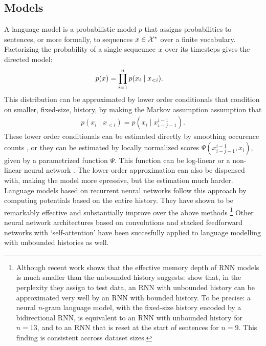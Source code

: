   \subsection{Models}
    A language model is a probabilistic model $p$ that assigns probabilities to sentences, or more formally, to sequences $x \in \mathcal{X}^{*}$ over a finite vocabulary. Factorizing the probability of a single sequeunce $x$ over its timesteps gives the directed model:
    \begin{align}
      \label{eq:lm-factorized}
      p( x )
        &= \prod_{i=1}^n p(x_i \mid x_{<i}).
    \end{align}
    This distribution can be approximated by lower order conditionals that condition on smaller, fixed-size, history, by making the Markov assumption assumption that
    \begin{align*}
      p(x_i \mid x_{<i}) = p(x_i \mid x_{i-j-1}^{i-1}).
    \end{align*}
    These lower order conditionals can be estimated directly by smoothing occurence counts \citep{chen1999empirical,kneser1995improved}, or they can be estimated by locally normalized scores $\Psi(x_{i-j-1}^{i-1}, x_i)$, given by a parametrized function $\Psi$. This function can be log-linear or a non-linear neural network \citep{rosenfeld1996loglinear,bengio2003neural}. The lower order approximation can also be dispensed with, making the model more epressive, but the estimation much harder. Language models based on recurrent neural networks follow this approach by computing potentials based on the entire history. They have shown to be remarkably effective and substantially improve over the above methods \citep{mikolov2010recurrent,zaremba2014recurrent}\footnote{Although recent work shows that the effective memory depth of RNN models is much smaller than the unbounded history suggests: \citet{chelba2017n} show that, in the perplexity they assign to test data, an RNN with unbounded history can be approximated very well by an RNN with bounded history. To be precise: a neural $n$-gram language model, with the fixed-size history encoded by a bidirectional RNN, is equivalent to an RNN with unbounded history for $n=13$, and to an RNN that is reset at the start of sentences for $n=9$. This finding is consistent accross dataset sizes.} Other neural network architectures based on convolutions \citep{kalchbrenner2014convolutional} and stacked feedforward networks with `self-attention' \citep{vaswani2017attention} have been succesfully applied to language modelling with unbounded histories as well.

